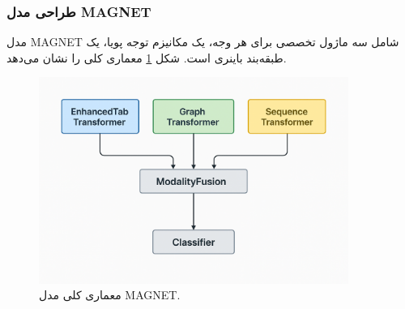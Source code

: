 \subsubsection{طراحی مدل MAGNET}
مدل MAGNET شامل سه ماژول تخصصی برای هر وجه، یک مکانیزم توجه پویا، یک طبقه‌بند باینری است. شکل \ref{fig:magnet_architecture} معماری کلی را نشان می‌دهد.

\begin{figure}[ht]
	\centering
    \includegraphics[width=0.9\textwidth]{images/magnet_architecture}
    \caption{معماری کلی مدل MAGNET.}
    \label{fig:magnet_architecture}
\end{figure}


